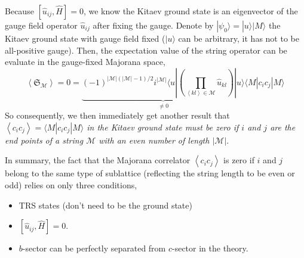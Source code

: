 \documentclass[12font]{article}
\theoremstyle{definition}
\numberwithin{equation}{section}
\newcommand{\bra}[1]{\langle #1 |}
\newcommand{\ket}[1]{| #1 \rangle}
\newcommand{\anglelr}[1]{\left\langle #1 \right\rangle}
\newcommand{\lr}[1]{\left(  #1  \right)}
\newcommand{\abs}[1]{\left|  #1  \right|}
\begin{document}
Because $[\hat{u}_{ij},\hat{H}] = 0$, we know the Kitaev ground state is an eigenvector of the gauge field operator $\hat{u}_{ij}$ after fixing the gauge. Denote by $\ket{\psi_0} = \ket{u}\ket{M}$ the Kitaev ground state with gauge field fixed ($\ket{u}$ can be arbitrary, it has not to be all-positive gauge). Then, the expectation value of the string operator can be evaluate in the gauge-fixed Majorana space,
\[
\anglelr{\mathfrak{S}_\mathcal{M}} = 0 = \underbrace{(-1)^{\abs{\mathcal{M}}\lr{\abs{\mathcal{M}}-1}/2} i^{\abs{\mathcal{M}}} \bra{u}\lr{\prod_{\anglelr{kl}\in\mathcal{M}}\hat{u}_{kl}}\ket{u}}_{\neq 0} \bra{M}c_ic_j\ket{M}
\]
So consequently, we then immediately get another result that \emph{$\anglelr{c_ic_j} = \bra{M}c_ic_j\ket{M}$ in the Kitaev ground state must be zero if $i$ and $j$ are the end points of a string $\mathcal{M}$ with an even number of length $\abs{\mathcal{M}}$}. 

In summary, the fact that the Majorana correlator $\anglelr{c_ic_j}$ is zero if $i$ and $j$ belong to the same type of sublattice (reflecting the string length to be even or odd) relies on only three conditions,
\begin{itemize}
  \item TRS states (don't need to be the ground state)
  \item $[\hat{u}_{ij},\hat{H}] = 0$.
  \item $b$-sector can be perfectly separated from $c$-sector in the theory.
\end{itemize}
\end{document}
